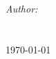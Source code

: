 \begin{titlepage}
\HRule \\[1.5cm]
{ \huge \bfseries \projectTitle}\\[0.4cm] %
\HRule \\[1.5cm]
 

\emph{Author:}\\
\authorFN \textsc{ \authorLN} \\
\matricle\\[2.0cm] %


\vfill
{\large  \today}\\[2cm] %

\end{titlepage}
